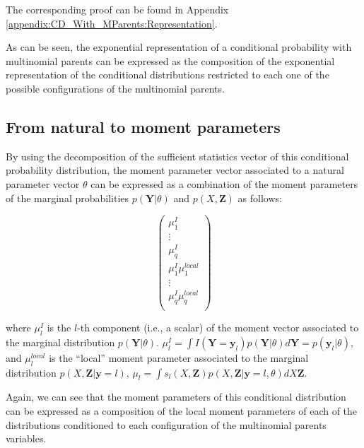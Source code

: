 \documentclass[11pt, oneside]{article}   	%
\newcommand{\bm}{\mathbf}
\numberwithin{figure}{section}
\numberwithin{equation}{section}
\numberwithin{table}{section}
\theoremstyle{definition}
\begin{document}
The corresponding proof can be found in Appendix \ref{appendix:CD_With_MParents:Representation}.

As can be seen, the exponential representation of a conditional probability with multinomial parents can be expressed as the composition of the exponential representation of the conditional distributions restricted to each one of the possible configurations of the multinomial parents. 

\subsection{From natural to moment parameters} \label{Section:CD_With_MParents:NaturalToMoment}

By using the decomposition of the sufficient statistics vector of this conditional probability distribution, the moment parameter vector associated to a natural parameter vector $\theta$ can be expressed as a combination of the moment parameters of the marginal probabilities $p(\bm Y|\theta)$ and $p(X, \bm Z)$ as follows:

$$ 
\begin{pmatrix}
\mu^{I}_1  \\
\vdots \\
\mu^{I}_q \\
\mu^{I}_1 \mu^{local}_1\\
\vdots \\
\mu^{I}_q \mu^{local}_q\\
\end{pmatrix}
$$

\noindent where  $\mu^{I}_l$ is the $l$-th component (i.e., a scalar) of the moment vector associated to the marginal distribution $p(\bm Y|\theta)$.  $\mu^{I}_l  = \int I(\bm Y = \bm y_l) p(\bm Y|\theta) d\bm Y= p(\bm y_l|\theta)$, and $\mu^{local}_l$  is the ``local'' moment parameter associated to the marginal distribution $p(X,\bm Z| \bm y = l)$, $\mu_l = \int s_l(X, \bm Z)p(X,\bm Z|\bm y = l, \theta) dX\bm Z$. 

Again, we can see that the moment parameters of this conditional distribution can be expressed as a composition of the local moment parameters of each of the distributions conditioned to each configuration of the multinomial parents variables. 

\end{document}
